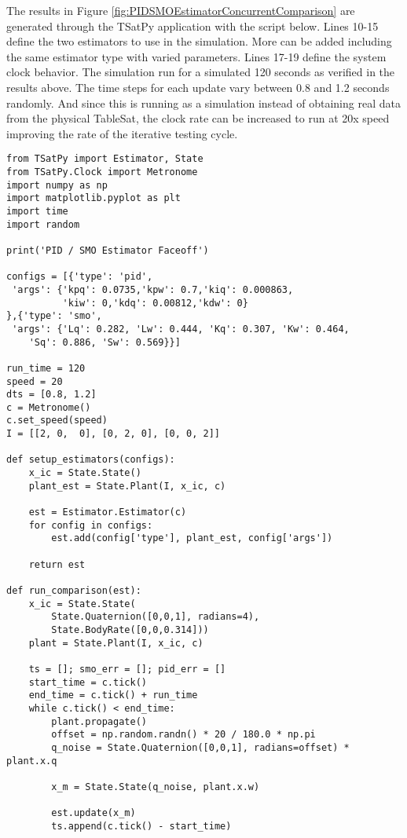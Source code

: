 The results in Figure \ref{fig:PIDSMOEstimatorConcurrentComparison} are generated through the TSatPy application with the script below.  Lines 10-15 define the two estimators to use in the simulation.  More can be added including the same estimator type with varied parameters.  Lines 17-19 define the system clock behavior.  The simulation run for a simulated 120 seconds as verified in the results above.  The time steps for each update vary between 0.8 and 1.2 seconds randomly.  And since this is running as a simulation instead of obtaining real data from the physical TableSat, the clock rate can be increased to run at 20x speed improving the rate of the iterative testing cycle.

\begin{singlespace}
  \begin{verbatim}
from TSatPy import Estimator, State
from TSatPy.Clock import Metronome
import numpy as np
import matplotlib.pyplot as plt
import time
import random

print('PID / SMO Estimator Faceoff')

configs = [{'type': 'pid',
 'args': {'kpq': 0.0735,'kpw': 0.7,'kiq': 0.000863,
          'kiw': 0,'kdq': 0.00812,'kdw': 0}
},{'type': 'smo',
 'args': {'Lq': 0.282, 'Lw': 0.444, 'Kq': 0.307, 'Kw': 0.464,
    'Sq': 0.886, 'Sw': 0.569}}]

run_time = 120
speed = 20
dts = [0.8, 1.2]
c = Metronome()
c.set_speed(speed)
I = [[2, 0,  0], [0, 2, 0], [0, 0, 2]]

def setup_estimators(configs):
    x_ic = State.State()
    plant_est = State.Plant(I, x_ic, c)

    est = Estimator.Estimator(c)
    for config in configs:
        est.add(config['type'], plant_est, config['args'])

    return est

def run_comparison(est):
    x_ic = State.State(
        State.Quaternion([0,0,1], radians=4),
        State.BodyRate([0,0,0.314]))
    plant = State.Plant(I, x_ic, c)

    ts = []; smo_err = []; pid_err = []
    start_time = c.tick()
    end_time = c.tick() + run_time
    while c.tick() < end_time:
        plant.propagate()
        offset = np.random.randn() * 20 / 180.0 * np.pi
        q_noise = State.Quaternion([0,0,1], radians=offset) * plant.x.q

        x_m = State.State(q_noise, plant.x.w)

        est.update(x_m)
        ts.append(c.tick() - start_time)


\end{verbatim}
\end{singlespace}

